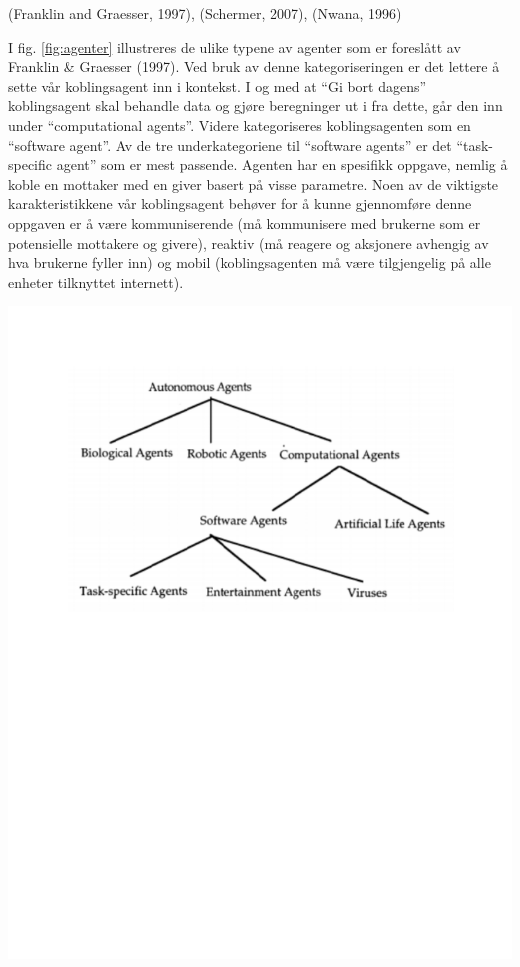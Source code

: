 (Franklin and Graesser, 1997)\cite{agent}, (Schermer, 2007)\cite{schermer}, (Nwana, 1996)\cite{nwana}

I fig. \ref{fig:agenter} illustreres de ulike typene av agenter som er foreslått av Franklin \& Graesser (1997)\cite{agent}. Ved bruk av denne kategoriseringen er det lettere å sette vår koblingsagent inn i kontekst. I og med at ``Gi bort dagens'' koblingsagent skal behandle data og gjøre beregninger ut i fra dette, går den inn under ``computational agents''. Videre kategoriseres koblingsagenten som en ``software agent''. Av de tre underkategoriene til ``software agents'' er det ``task-specific agent'' som er mest passende. Agenten har en spesifikk oppgave, nemlig å koble en mottaker med en giver basert på visse parametre. Noen av de viktigste karakteristikkene vår koblingsagent behøver for å kunne gjennomføre denne oppgaven er å være kommuniserende (må kommunisere med brukerne som er potensielle mottakere og givere), reaktiv (må reagere og aksjonere avhengig av hva brukerne fyller inn) og mobil (koblingsagenten må være tilgjengelig på alle enheter tilknyttet internett).


\begin{center}
\includegraphics[clip=true, width=1 \textwidth,
trim=0cm 14cm 0cm 1.5cm]{agenter.pdf}
\label{fig:agenter}
\end{center}
